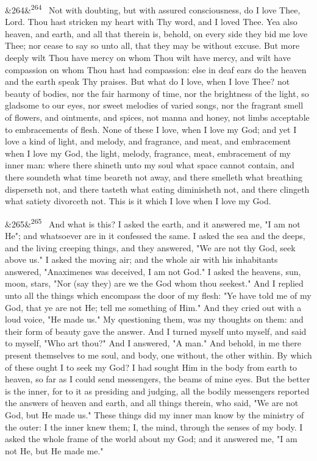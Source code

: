 \documentclass[12pt]{article}
\newcommand{\para}[1][]{\par\noindent\ifx&#1&\else\textsuperscript{\footnotesize #1}~\fi}
\begin{document}
\para[264] Not with doubting, but with assured consciousness, do I love Thee, Lord. Thou hast stricken my heart with Thy word, and I loved Thee. Yea also heaven, and earth, and all that therein is, behold, on every side they bid me love Thee; nor cease to say so unto all, that they may be without excuse. But more deeply wilt Thou have mercy on whom Thou wilt have mercy, and wilt have compassion on whom Thou hast had compassion: else in deaf ears do the heaven and the earth speak Thy praises. But what do I love, when I love Thee? not beauty of bodies, nor the fair harmony of time, nor the brightness of the light, so gladsome to our eyes, nor sweet melodies of varied songs, nor the fragrant smell of flowers, and ointments, and spices, not manna and honey, not limbs acceptable to embracements of flesh. None of these I love, when I love my God; and yet I love a kind of light, and melody, and fragrance, and meat, and embracement when I love my God, the light, melody, fragrance, meat, embracement of my inner man: where there shineth unto my soul what space cannot contain, and there soundeth what time beareth not away, and there smelleth what breathing disperseth not, and there tasteth what eating diminisheth not, and there clingeth what satiety divorceth not. This is it which I love when I love my God.

\para[265] And what is this? I asked the earth, and it answered me, "I am not He"; and whatsoever are in it confessed the same. I asked the sea and the deeps, and the living creeping things, and they answered, "We are not thy God, seek above us." I asked the moving air; and the whole air with his inhabitants answered, "Anaximenes was deceived, I am not God." I asked the heavens, sun, moon, stars, "Nor (say they) are we the God whom thou seekest." And I replied unto all the things which encompass the door of my flesh: "Ye have told me of my God, that ye are not He; tell me something of Him." And they cried out with a loud voice, "He made us." My questioning them, was my thoughts on them: and their form of beauty gave the answer. And I turned myself unto myself, and said to myself, "Who art thou?" And I answered, "A man." And behold, in me there present themselves to me soul, and body, one without, the other within. By which of these ought I to seek my God? I had sought Him in the body from earth to heaven, so far as I could send messengers, the beams of mine eyes. But the better is the inner, for to it as presiding and judging, all the bodily messengers reported the answers of heaven and earth, and all things therein, who said, "We are not God, but He made us." These things did my inner man know by the ministry of the outer: I the inner knew them; I, the mind, through the senses of my body. I asked the whole frame of the world about my God; and it answered me, "I am not He, but He made me."
\end{document}
